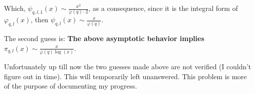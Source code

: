 \documentclass{article}
\begin{document}
Which, $\psi_{q,l,1}(x)\sim \frac{x^2}{\varphi(q)\cdot 2}$, as a consequence, since it is the integral form of $\varphi_{q,l}(x)$, then $\psi_{q,l}(x)\sim \frac{x}{\varphi(q)}$.

The second guess is: \textbf{\label{guess:2} The above asymptotic behavior implies $\pi_{q,l}(x)\sim \frac{x}{\varphi(q)\log(x)}$}.

Unfortunately up till now the two guesses made above are not verified (I couldn't figure out in time). This will temporarily left unanswered. This problem is more of the purpose of documenting my progress.
\end{document}
